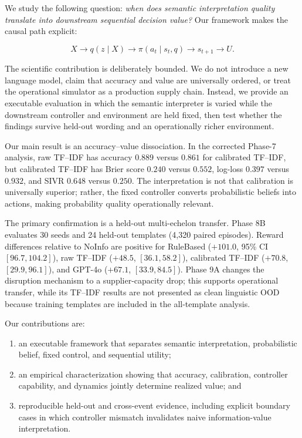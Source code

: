 \documentclass[10pt]{article}
\begin{document}
We study the following question: \emph{when does semantic interpretation quality translate into downstream sequential decision value?} Our framework makes the causal path explicit:

\begin{equation}
X \longrightarrow q(z\mid X) \longrightarrow \pi(a_t\mid s_t,q) \longrightarrow s_{t+1} \longrightarrow U.
\end{equation}

The scientific contribution is deliberately bounded. We do not introduce a new language model, claim that accuracy and value are universally ordered, or treat the operational simulator as a production supply chain. Instead, we provide an executable evaluation in which the semantic interpreter is varied while the downstream controller and environment are held fixed, then test whether the findings survive held-out wording and an operationally richer environment.

Our main result is an accuracy--value dissociation. In the corrected Phase-7 analysis, raw TF--IDF has accuracy $0.889$ versus $0.861$ for calibrated TF--IDF, but calibrated TF--IDF has Brier score $0.240$ versus $0.552$, log-loss $0.397$ versus $0.932$, and SIVR $0.648$ versus $0.250$. The interpretation is not that calibration is universally superior; rather, the fixed controller converts probabilistic beliefs into actions, making probability quality operationally relevant.

The primary confirmation is a held-out multi-echelon transfer. Phase 8B evaluates 30 seeds and 24 held-out templates (4,320 paired episodes). Reward differences relative to NoInfo are positive for RuleBased ($+101.0$, 95\% CI $[96.7,104.2]$), raw TF--IDF ($+48.5$, $[36.1,58.2]$), calibrated TF--IDF ($+70.8$, $[29.9,96.1]$), and GPT-4o ($+67.1$, $[33.9,84.5]$). Phase 9A changes the disruption mechanism to a supplier-capacity drop; this supports operational transfer, while its TF--IDF results are not presented as clean linguistic OOD because training templates are included in the all-template analysis.

Our contributions are:
\begin{enumerate}
  \item an executable framework that separates semantic interpretation, probabilistic belief, fixed control, and sequential utility;
  \item an empirical characterization showing that accuracy, calibration, controller capability, and dynamics jointly determine realized value; and
  \item reproducible held-out and cross-event evidence, including explicit boundary cases in which controller mismatch invalidates naive information-value interpretation.
\end{enumerate}
\end{document}

